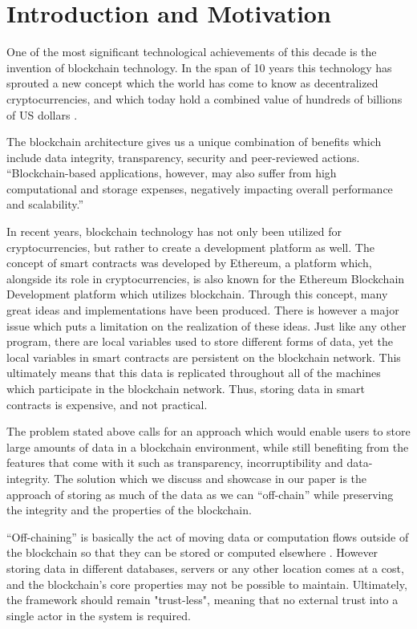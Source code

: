 \section{Introduction and Motivation}

One of the most significant technological achievements of this decade is the invention of blockchain technology. In the span of 10 years this technology has sprouted a new concept which the world has come to know as decentralized cryptocurrencies, and which today hold a combined value of hundreds of billions of US dollars \cite{relatedWork40}.

The blockchain architecture gives us a unique combination of benefits which include data integrity, transparency, security and peer-reviewed actions. 
“Blockchain-based applications, however, may also suffer from high computational and storage expenses, negatively impacting overall performance and scalability.” \cite{Eberhardt2017}

In recent years, blockchain technology has not only been utilized for cryptocurrencies, but rather to create a development platform as well. The concept of smart contracts was developed by Ethereum, a platform which, alongside its role in cryptocurrencies, is also known for the Ethereum Blockchain Development platform which utilizes blockchain. Through this concept, many great ideas and implementations have been produced. There is however a major issue which puts a limitation on the realization of these ideas. Just like any other program, there are local variables used to store different forms of data, yet the local variables in smart contracts are persistent on the blockchain network. This ultimately means that this data is replicated throughout all of the machines which participate in the blockchain network. Thus, storing data in smart contracts is expensive, and not practical.

The problem stated above calls for an approach which would enable users to store large amounts of data in a blockchain environment, while still benefiting from the features that come with it such as transparency, incorruptibility and data-integrity. The solution which we discuss and showcase in our paper is the approach of storing as much of the data as we can “off-chain” while preserving the integrity and the properties of the blockchain.

“Off-chaining” is basically the act of moving data or computation flows outside of the blockchain so that they can be stored or computed elsewhere \cite{Eberhardt2017}. However storing data in different databases, servers or any other location comes at a cost, and the blockchain’s core properties may not be possible to maintain. Ultimately, the framework should remain "trust-less", meaning that no external trust into a single actor in the system is required. 

